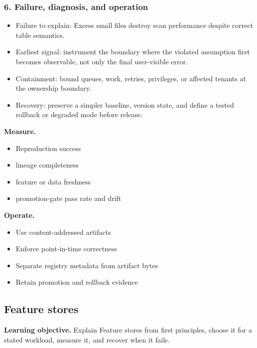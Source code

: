 \subsubsection*{6. Failure, diagnosis, and operation}
\begin{itemize}
\item Failure to explain: Excess small files destroy scan performance despite correct table semantics.
\item Earliest signal: instrument the boundary where the violated assumption first becomes observable, not only the final user-visible error.
\item Containment: bound queues, work, retries, privileges, or affected tenants at the ownership boundary.
\item Recovery: preserve a simpler baseline, version state, and define a tested rollback or degraded mode before release.
\end{itemize}
\textbf{Measure.}\begin{itemize}
\item Reproduction success
\item lineage completeness
\item feature or data freshness
\item promotion-gate pass rate and drift
\end{itemize}
\textbf{Operate.}\begin{itemize}
\item Use content-addressed artifacts
\item Enforce point-in-time correctness
\item Separate registry metadata from artifact bytes
\item Retain promotion and rollback evidence
\end{itemize}
\subsection{Feature stores}
\textbf{Learning objective.} Explain Feature stores from first principles, choose it for a stated workload, measure it, and recover when it fails.
